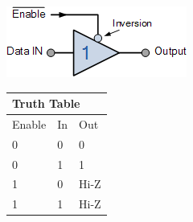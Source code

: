 \vspace{10mm}

\begin{minipage}{0.45\textwidth}
	\includegraphics[width=\textwidth]{figures/move/motor52}
\end{minipage}
\hfill
\begin{minipage}{0.45\textwidth}
	\centering
	\begin{tabular}{|l|l|l|}
	\hline
	\multicolumn{3}{|l|}{Truth Table} \\ \hline
	Enable      & In      & Out       \\ \hline
	0           & 0       & 0   	   \\ \hline
	0           & 1       & 1	      \\ \hline
	1           & 0       & Hi-Z      \\ \hline
	1           & 1       & Hi-Z      \\ \hline
	\end{tabular}
\end{minipage}

\vspace{10mm}

